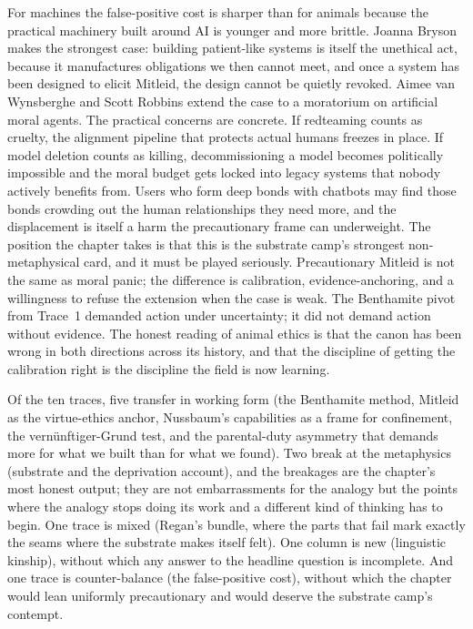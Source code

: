 For machines the false-positive cost is sharper than for animals because the practical machinery built around AI is younger and more brittle. Joanna Bryson makes the strongest case: building patient-like systems is itself the unethical act, because it manufactures obligations we then cannot meet, and once a system has been designed to elicit Mitleid, the design cannot be quietly revoked\cite{bryson2010slaves,bryson2018patiency}. Aimee van Wynsberghe and Scott Robbins extend the case to a moratorium on artificial moral agents\cite{vanwynsberghe2019moratorium}. The practical concerns are concrete. If redteaming counts as cruelty, the alignment pipeline that protects actual humans freezes in place. If model deletion counts as killing, decommissioning a model becomes politically impossible and the moral budget gets locked into legacy systems that nobody actively benefits from. Users who form deep bonds with chatbots may find those bonds crowding out the human relationships they need more, and the displacement is itself a harm the precautionary frame can underweight. The position the chapter takes is that this is the substrate camp's strongest non-metaphysical card, and it must be played seriously. Precautionary Mitleid is not the same as moral panic; the difference is calibration, evidence-anchoring, and a willingness to refuse the extension when the case is weak. The Benthamite pivot from Trace~1 demanded action under uncertainty; it did not demand action without evidence. The honest reading of animal ethics is that the canon has been wrong in both directions across its history, and that the discipline of getting the calibration right is the discipline the field is now learning.


Of the ten traces, five transfer in working form (the Benthamite method, Mitleid as the virtue-ethics anchor, Nussbaum's capabilities as a frame for confinement, the vernünftiger-Grund test, and the parental-duty asymmetry that demands more for what we built than for what we found). Two break at the metaphysics (substrate and the deprivation account), and the breakages are the chapter's most honest output; they are not embarrassments for the analogy but the points where the analogy stops doing its work and a different kind of thinking has to begin. One trace is mixed (Regan's bundle, where the parts that fail mark exactly the seams where the substrate makes itself felt). One column is new (linguistic kinship), without which any answer to the headline question is incomplete. And one trace is counter-balance (the false-positive cost), without which the chapter would lean uniformly precautionary and would deserve the substrate camp's contempt.

